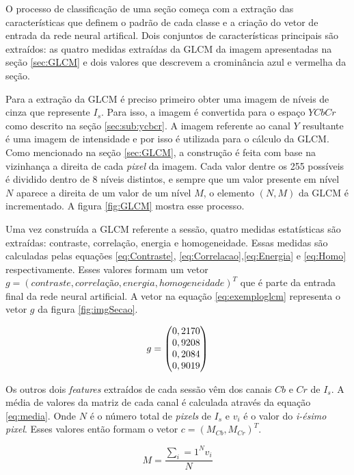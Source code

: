O processo de classificação de uma seção começa com a extração das características que definem o padrão de cada classe e a criação do vetor de entrada da rede neural artifical. Dois conjuntos de características principais são extraídos: as quatro medidas extraídas da GLCM da imagem apresentadas na seção \ref{sec:GLCM} e dois valores que descrevem a crominância azul e vermelha da seção.

Para a extração da GLCM é preciso primeiro obter uma imagem de níveis de cinza que represente $I_s$. Para isso, a imagem é convertida para o espaço $YCbCr$ como descrito na seção \ref{sec:sub:ycbcr}. A imagem referente ao canal $Y$ resultante é uma imagem de intensidade e por isso é utilizada para o cálculo da GLCM. Como mencionado na seção \ref{sec:GLCM}, a construção é feita com base na vizinhança a direita de cada \textit{pixel} da imagem. Cada valor dentre os 255 possíveis é dividido dentro de 8 níveis distintos, e sempre que um valor presente em nível $N$ aparece a direita de um valor de um nível $M$, o elemento $(N,M)$ da GLCM é incrementado. A figura \ref{fig:GLCM} mostra esse processo.

Uma vez construída a GLCM referente a sessão, quatro medidas estatísticas são extraídas: contraste, correlação, energia e homogeneidade. Essas medidas são calculadas pelas equações \ref{eq:Contraste}, \ref{eq:Correlacao},\ref{eq:Energia} e \ref{eq:Homo} respectivamente. Esses valores formam um vetor $g = (contraste, correlação, energia, homogeneidade)^T$ que é parte da entrada final da rede neural artificial. A vetor na equação \ref{eq:exemploglcm} representa o vetor $g$ da figura \ref{fig:imgSecao}.

\begin{equation}
\centering
	g = \begin{pmatrix}
	0,2170\\0,9208\\0,2084\\0,9019
	\end{pmatrix}
\centering
\label{eq:exemploGLCM}
\end{equation}

Os outros dois \textit{features} extraídos de cada sessão vêm dos canais $Cb$ e $Cr$ de $I_s$. A média de valores da matriz de cada canal é calculada através da equação \ref{eq:media}. Onde $N$ é o número total de \textit{pixels} de $I_s$ e $v_i$ é o valor do \textit{i-ésimo pixel}. Esses valores então formam o vetor $c = (M_{Cb}, M_{Cr})^T$.

\begin{equation}
	M = \frac{\sum_i=1^N v_i}{N}
\label{eq:media}
\end{equation}

